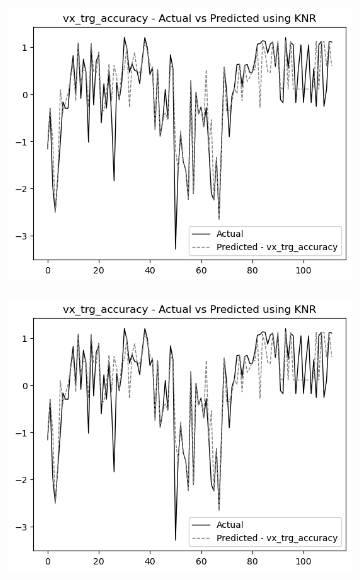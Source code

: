 \begin{figure}
    \begin{subfigure}[b]{0.49\textwidth}
        \centering
        \includegraphics[width=\linewidth]{images/all_data_visual_target_accuracy.png}
    \end{subfigure}\hfill
    \begin{subfigure}[b]{0.49\textwidth}
        \centering
        \includegraphics[width=\linewidth]{images/all_data_visual_target_accuracy.png}
    \end{subfigure}
    

\end{figure}
